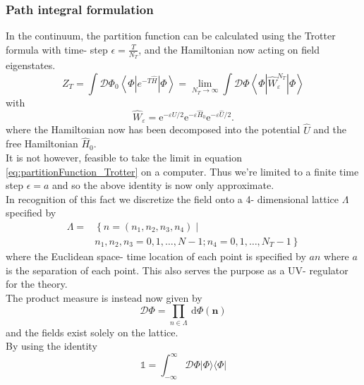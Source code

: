 \documentclass[a4paper,10pt]{article}
\begin{document}
\subsubsection{Path integral formulation}
In the continuum, the partition function can be calculated using the Trotter formula with time- step $\epsilon = \frac{T}{N_T}$, and the Hamiltonian now acting on field eigenstates.  
\begin{equation}\label{eq:partitionFunction_Trotter}
Z_{T}=\int \mathcal{D} \Phi_{0}\left\langle\Phi\left|e^{-T \widehat{H}}\right| \Phi\right\rangle=\lim _{N_{T} \rightarrow \infty} \int \mathcal{D} \Phi\left\langle\Phi\left|\widehat{W}_{\varepsilon}^{N_{T}}\right| \Phi\right\rangle
\end{equation}
with
\begin{equation}\label{eq:W_trotter}
\widehat{W}_{\varepsilon}=\mathrm{e}^{-\varepsilon \hat{U} / 2} \mathrm{e}^{-\varepsilon \widehat{H}_{0}} \mathrm{e}^{-\varepsilon \widehat{U} / 2}.
\end{equation}
where the Hamiltonian now has been decomposed into the potential $\hat{U}$ and the free Hamiltonian $\widehat{H}_{0}$. \\It is not however, feasible to take the limit in equation \eqref{eq:partitionFunction_Trotter} on a computer. Thus we're limited to a finite time step $\epsilon = a$ and so the above identity is now only approximate.\\In recognition of this fact we discretize the field onto a 4- dimensional lattice $\Lambda$ specified by
\begin{equation}
\begin{aligned}
\Lambda=&\left\{n=\left(n_{1}, n_{2}, n_{3}, n_{4}\right) \mid\right.\\
&\left.n_{1}, n_{2}, n_{3}=0,1, \ldots, N-1 ; n_{4}=0,1, \ldots, N_{T}-1\right\}
\end{aligned}
\end{equation}
where the Euclidean space- time location of each point is specified by $an$ where $a$ is the separation of each point. This also serves the purpose as a UV- regulator for the theory.\\ The product measure is instead now given by
\begin{equation}
\mathcal{D} \Phi=\prod_{n \in \Lambda} \mathrm{~d} \Phi(\boldsymbol{n})
\end{equation}
and the fields exist solely on the lattice.\\ By using the identity 
\begin{equation}
\mathbb{1}=\int_{-\infty}^{\infty} \mathcal{D} \Phi|\Phi\rangle\langle\Phi|
\end{equation}
\end{document}
